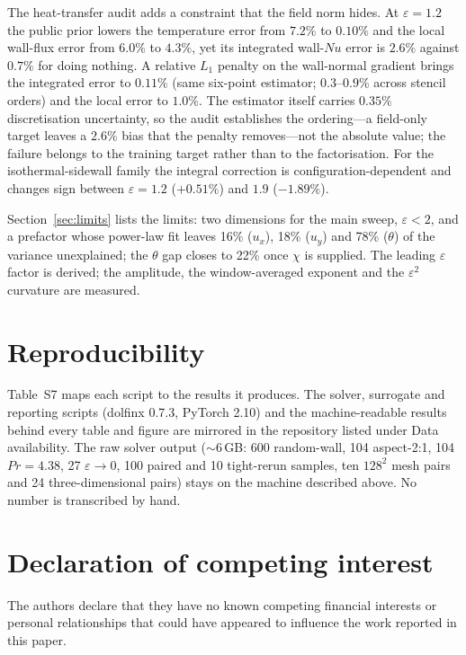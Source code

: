 \documentclass[preprint,11pt,a4paper,times,doubleblind]{elsarticle}
\begin{document}
The heat-transfer audit adds a constraint that the field norm hides. At $\varepsilon=1.2$ the
public prior lowers the temperature error from $7.2\%$ to $0.10\%$ and the local wall-flux error
from $6.0\%$ to $4.3\%$, yet its integrated wall-$Nu$ error is $2.6\%$ against $0.7\%$ for doing
nothing. A relative $L_1$ penalty on the wall-normal gradient brings the integrated error to
$0.11\%$ (same six-point estimator; $0.3$--$0.9\%$ across stencil orders) and the local error to $1.0\%$. The estimator itself carries $0.35\%$ discretisation uncertainty,
so the audit establishes the ordering---a field-only target leaves a $2.6\%$ bias that the penalty
removes---not the absolute value; the failure belongs to the training target rather than
to the factorisation. For the isothermal-sidewall family the integral correction is
configuration-dependent and changes sign between $\varepsilon=1.2$ ($+0.51\%$) and $1.9$ ($-1.89\%$).

Section~\ref{sec:limits} lists the limits: two dimensions for the main sweep, $\varepsilon<2$, and
a prefactor whose power-law fit leaves 16\% ($u_x$), 18\% ($u_y$) and 78\% ($\theta$) of the
variance unexplained; the $\theta$ gap closes to 22\% once $\chi$ is supplied. The leading
$\varepsilon$ factor is derived; the amplitude, the window-averaged exponent and the
$\varepsilon^2$ curvature are measured.

\section{Reproducibility}
\label{sec:repro}

Table~S7 maps each script to the results it produces. The solver, surrogate and reporting
scripts (dolfinx 0.7.3, PyTorch 2.10) and the machine-readable results behind every table and
figure are mirrored in the repository listed under Data availability. The raw solver output
($\sim$6\,GB: 600 random-wall, 104 aspect-2:1, 104 $Pr=4.38$, 27 $\varepsilon\to0$, 100 paired and
10 tight-rerun samples, ten $128^2$ mesh pairs and 24 three-dimensional pairs) stays on the machine
described above. No number is transcribed by hand.

\section*{Declaration of competing interest}
The authors declare that they have no known competing financial interests or personal
relationships that could have appeared to influence the work reported in this paper.
\end{document}
